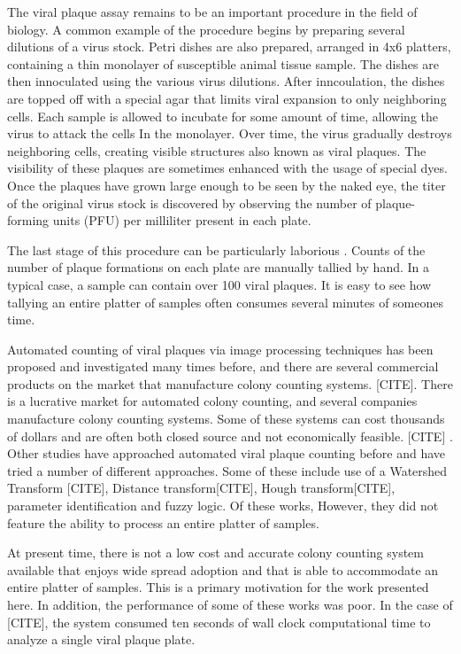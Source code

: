 \documentclass[11pt,final,twocolumn]{IEEEtran}
\begin{document}
The viral plaque assay remains to be an important procedure in the field of biology. A common example of the procedure begins by preparing several dilutions of a virus stock. Petri dishes are also prepared, arranged in 4x6 platters, containing a thin monolayer of susceptible animal tissue sample.  The dishes are then innoculated using the various virus dilutions. After inncoulation, the dishes are topped off with a special agar that limits viral expansion to only neighboring cells. Each sample is allowed to incubate for some amount of time, allowing the virus to attack the cells In the monolayer. Over time, the virus gradually destroys neighboring cells, creating visible structures also known as viral plaques. The visibility of these plaques are sometimes enhanced with the usage of special dyes. Once the plaques have grown large enough to be seen by the naked eye, the titer of the original virus stock is discovered by observing the number of  plaque-forming units (PFU) per milliliter present in each plate.

The last stage of this procedure can be particularly laborious . Counts  of the number of plaque formations on each plate are manually tallied by hand. In a typical case, a sample can contain over 100 viral plaques. It is easy to see how tallying an entire platter of samples often consumes several minutes of someones time. 


Automated counting of viral plaques via image processing techniques  has been proposed and investigated many times before, and there are several commercial products on the market that manufacture colony counting systems. [CITE].  There is a lucrative market for automated colony counting, and several companies manufacture colony counting systems. Some of these systems can cost thousands of dollars and are often both closed source and not economically feasible. [CITE] . Other studies have approached automated viral plaque counting before and have tried a number of different  approaches. Some of these include use of a Watershed Transform [CITE], Distance transform[CITE],  Hough transform[CITE], parameter identification and fuzzy logic. Of these works, However,  they did not feature the ability to process an entire platter of samples. 

At present time,  there is not a low cost and  accurate colony counting system available that enjoys wide spread adoption and that is able to accommodate an entire platter of samples. This is a primary motivation for the work presented here. In addition, the performance of some of these works was poor. In the case of [CITE], the system consumed ten seconds of wall clock computational time to analyze a single viral plaque plate. 
\end{document}
